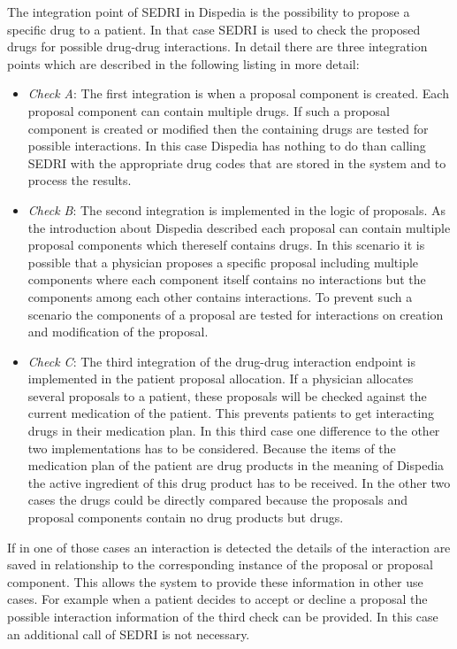 The integration point of SEDRI in Dispedia is the possibility to propose a specific drug to a patient.
In that case SEDRI is used to check the proposed drugs for possible drug-drug interactions.
In detail there are three integration points which are described in the following listing in more detail: 
\begin{itemize}
\item \textit{Check A}: The first integration is when a proposal component is created.
Each proposal component can contain multiple drugs.
If such a proposal component is created or modified then the containing drugs are tested for possible interactions.
In this case Dispedia has nothing to do than calling SEDRI with the appropriate drug codes that are stored in the system and to process the results.
\item \textit{Check B}: The second integration is implemented in the logic of proposals.
As the introduction about Dispedia described each proposal can contain multiple proposal components which thereself contains drugs.
In this scenario it is possible that a physician proposes a specific proposal including multiple components where each component itself contains no interactions but the components among each other contains interactions.
To prevent such a scenario the components of a proposal are tested for interactions on creation and modification of the proposal.
\item \textit{Check C}: The third integration of the drug-drug interaction endpoint is implemented in the patient proposal allocation.
If a physician allocates several proposals to a patient, these proposals will be checked against the current medication of the patient.
This prevents patients to get interacting drugs in their medication plan.
In this third case one difference to the other two implementations has to be considered.
Because the items of the medication plan of the patient are drug products in the meaning of Dispedia the active ingredient of this drug product has to be received.
In the other two cases the drugs could be directly compared because the proposals and proposal components contain no drug products but drugs.
\end{itemize}
If in one of those cases an interaction is detected the details of the interaction are saved in relationship to the corresponding instance of the proposal or proposal component.
This allows the system to provide these information in other use cases.
For example when a patient decides to accept or decline a proposal the possible interaction information of the third check can be provided.
In this case an additional call of SEDRI is not necessary.

